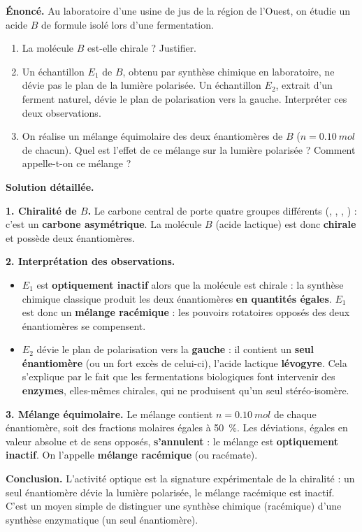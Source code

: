\documentclass[11pt]{article}
\begin{document}
\begin{exoresolu}
\textbf{Énoncé.} Au laboratoire d'une usine de jus de la région de l'Ouest, on étudie un acide $B$ de formule  isolé lors d'une fermentation.
\begin{enumerate}
\item La molécule $B$ est-elle chirale ? Justifier.
\item Un échantillon $E_1$ de $B$, obtenu par synthèse chimique en laboratoire, ne dévie pas le plan de la lumière polarisée. Un échantillon $E_2$, extrait d'un ferment naturel, dévie le plan de polarisation vers la gauche. Interpréter ces deux observations.
\item On réalise un mélange équimolaire des deux énantiomères de $B$ ($n = \SI{0,10}{mol}$ de chacun). Quel est l'effet de ce mélange sur la lumière polarisée ? Comment appelle-t-on ce mélange ?
\end{enumerate}
\tcblower
\textbf{Solution détaillée.}

\textbf{1. Chiralité de $B$.} Le carbone central de  porte quatre groupes différents (, , , ) : c'est un \textbf{carbone asymétrique}. La molécule $B$ (acide lactique) est donc \textbf{chirale} et possède deux énantiomères.

\textbf{2. Interprétation des observations.}
\begin{itemize}
\item $E_1$ est \textbf{optiquement inactif} alors que la molécule est chirale : la synthèse chimique classique produit les deux énantiomères \textbf{en quantités égales}. $E_1$ est donc un \textbf{mélange racémique} : les pouvoirs rotatoires opposés des deux énantiomères se compensent.
\item $E_2$ dévie le plan de polarisation vers la \textbf{gauche} : il contient un \textbf{seul énantiomère} (ou un fort excès de celui-ci), l'acide lactique \textbf{lévogyre}. Cela s'explique par le fait que les fermentations biologiques font intervenir des \textbf{enzymes}, elles-mêmes chirales, qui ne produisent qu'un seul stéréo-isomère.
\end{itemize}

\textbf{3. Mélange équimolaire.} Le mélange contient $n = \SI{0,10}{mol}$ de chaque énantiomère, soit des fractions molaires égales à \SI{50}{\%}. Les déviations, égales en valeur absolue et de sens opposés, \textbf{s'annulent} : le mélange est \textbf{optiquement inactif}. On l'appelle \textbf{mélange racémique} (ou racémate).

\textbf{Conclusion.} L'activité optique est la signature expérimentale de la chiralité : un seul énantiomère dévie la lumière polarisée, le mélange racémique est inactif. C'est un moyen simple de distinguer une synthèse chimique (racémique) d'une synthèse enzymatique (un seul énantiomère).
\end{exoresolu}
\end{document}
